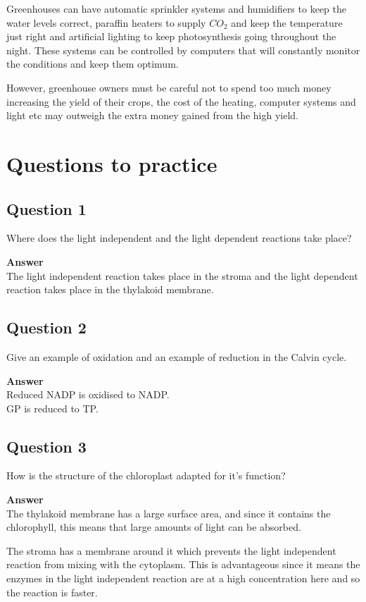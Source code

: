 \documentclass{article}
\begin{document}
Greenhouses can have automatic sprinkler systems and humidifiers to keep the
water levels correct, paraffin heaters to supply $CO_2$ and keep the temperature
just right and artificial lighting to keep photosynthesis going throughout the
night. These systems can be controlled by computers that will constantly monitor
the conditions and keep them optimum.

However, greenhouse owners must be careful not to spend too much money
increasing the yield of their crops, the cost of the heating, computer systems
and light etc may outweigh the extra money gained from the high yield.


\section*{Questions to practice}
\subsection*{Question 1}
Where does the light independent and the light dependent reactions take place?

\textbf{Answer}\\
The light independent reaction takes place in the stroma and the light dependent
reaction takes place in the thylakoid membrane.

\subsection*{Question 2}
Give an example of oxidation and an example of reduction in the Calvin cycle.

\textbf{Answer}\\
Reduced NADP is oxidised to NADP.\\
GP is reduced to TP.

\subsection*{Question 3}
How is the structure of the chloroplast adapted for it's function?

\textbf{Answer}\\
The thylakoid membrane has a large surface area, and since it contains the
chlorophyll, this means that large amounts of light can be absorbed.

The stroma has a membrane around it which prevents the light independent
reaction from mixing with the cytoplasm. This is advantageous since it means the
enzymes in the light independent reaction are at a high concentration here and
so the reaction is faster.
\end{document}
